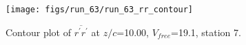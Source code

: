 \begin{figure}[H]
\centering
\texttt{[image: figs/run\_63/run\_63\_rr\_contour]}
\caption{Contour plot of $\overline{r^\prime r^\prime}$ at $z/c$=10.00, $V_{free}$=19.1, station 7.}
\label{fig:run_63_rr_contour}
\end{figure}


